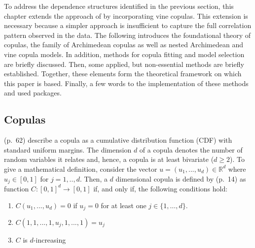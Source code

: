 \documentclass[
]{krantz}
\begin{document}
To address the dependence structures identified in the previous section,
this chapter
extends the approach of \citet{grimaldi2006} by incorporating vine copulas.
This extension is necessary because a simpler approach is insufficient to capture the full correlation pattern
observed in the data.
The following introduces the foundational theory of copulas,
the family of Archimedean copulas as well as nested Archimedean and vine copula models.
In addition, methods for copula fitting and model selection are briefly discussed.
Then, some applied, but non-essential methods are briefly established.
Together, these elements form the theoretical framework on which this paper is based.
Finally, a few words to the implementation of these methods and used packages.

\subsection{Copulas}\label{cops}

\citet{zhang2019} (p.~62) describe a copula as a cumulative distribution
function (CDF) with standard uniform margins. The dimension \(d\) of a copula
denotes the number of random variables it relates and, hence, a copula is at least bivariate (\(d \geq 2\)).
To give a mathematical definition, consider the vector
\(u = (u_1, ..., u_d) \in \mathbb{R}^d\) where \(u_j \in [0, 1]\) for
\(j = 1, .., d\). Then, a \(d\) dimensional copula is defined by
\citet{durante2016} (p.~14) as function \(C:[0,1]^d\to [0,1]\) if, and only if,
the following conditions hold:

\begin{enumerate}
\def\labelenumi{\roman{enumi})}
\item
  \(C(u_1, ..., u_d) = 0\) if \(u_j = 0\) for at least one
  \(j \in \{1,…,d\}\).
\item
  \(C(1, 1, ..., 1, u_j, 1, ..., 1) = u_j\)
\item
  \(C\) is \(d\)-increasing
\end{enumerate}
\end{document}
